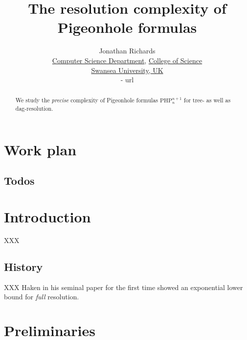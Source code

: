 \documentclass{report}
\newcommand{\php}{\mathrm{PHP}}
\begin{document}
\title{The resolution complexity of Pigeonhole formulas}

\author{
  Jonathan Richards\\
  \href{http://www.swan.ac.uk/compsci/}{Computer Science Department}, \href{http://www.swan.ac.uk/science/}{College of Science}\\
  \href{http://www.swan.ac.uk/}{Swansea University, UK}\\
  {- url}
}

\maketitle

\begin{abstract}
  We study the \emph{precise} complexity of Pigeonhole formulas $\php^{n+1}_n$ for tree- as well as dag-resolution.
\end{abstract}

\tableofcontents

\setcounter{chapter}{-1}
\chapter{Work plan}
\label{cha:workplan}

\section{Todos}
\label{sec:Todos}






\chapter{Introduction}
\label{cha:Introduction}

XXX

\section{History}
\label{sec:History}

XXX Haken in his seminal paper \cite{Haken1985Intractability} for the first time showed an exponential lower bound for \emph{full} resolution.



\chapter{Preliminaries}
\label{cha:Preliminaries}
\end{document}
